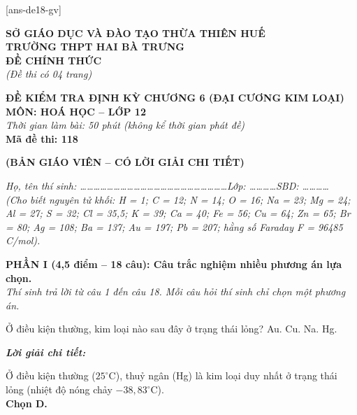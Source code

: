 \documentclass[11pt,a4paper]{article}
\def\loigiai#1{
\par\begingroup\color{blue!80!black}\small
\noindent\textbf{\textit{Lời giải chi tiết:}}\par
#1\par\endgroup}
\begin{document}
[ans-de18-gv]

\noindent
\begin{minipage}[t]{0.48\textwidth}
	\textbf{SỞ GIÁO DỤC VÀ ĐÀO TẠO THỪA THIÊN HUẾ}\\
	\textbf{TRƯỜNG THPT HAI BÀ TRƯNG}\\
	\textbf{ĐỀ CHÍNH THỨC}\\
	\textit{(Đề thi có 04 trang)}
\end{minipage}\hfill
\begin{minipage}[t]{0.48\textwidth}
	\raggedleft
	\textbf{\color{mainGreen}ĐỀ KIỂM TRA ĐỊNH KỲ CHƯƠNG 6 (ĐẠI CƯƠNG KIM LOẠI)}\\
	\textbf{MÔN: HOÁ HỌC -- LỚP 12}\\
	\textit{Thời gian làm bài: 50 phút (không kể thời gian phát đề)}\\
	\textbf{Mã đề thi: 118}
\end{minipage}


\vspace{0.1cm}
\begin{center}
	\textbf{\color{hfRed}\Large (BẢN GIÁO VIÊN -- CÓ LỜI GIẢI CHI TIẾT)}
\end{center}

\vspace{1pt}
\noindent\textit{Họ, tên thí sinh: \dots\dots\dots\dots\dots\dots\dots\dots\dots\dots\dots\dots\dots\dots\dots\dots\dots\dots\dots\dots\dots\dots Lớp: \dots\dots\dots\dots SBD: \dots\dots\dots\dots}\\
\noindent\textit{(Cho biết nguyên tử khối: H = 1; C = 12; N = 14; O = 16; Na = 23; Mg = 24; Al = 27; S = 32; Cl = 35,5; K = 39; Ca = 40; Fe = 56; Cu = 64; Zn = 65; Br = 80; Ag = 108; Ba = 137; Au = 197; Pb = 207; hằng số Faraday F = 96485 C/mol).}

\vspace{1pt}
\noindent
\textbf{PHẦN I (4,5 điểm -- 18 câu): Câu trắc nghiệm nhiều phương án lựa chọn.}\\
\textit{Thí sinh trả lời từ câu 1 đến câu 18. Mỗi câu hỏi thí sinh chỉ chọn một phương án.}

\begin{ex}
Ở điều kiện thường, kim loại nào sau đây ở trạng thái lỏng?
\choice
{Au.}
{Cu.}
{Na.}
{\True Hg.}
\loigiai{
Ở điều kiện thường ($25^\circ\text{C}$), thuỷ ngân (Hg) là kim loại duy nhất ở trạng thái lỏng (nhiệt độ nóng chảy $-38{,}83^\circ\text{C}$).\\
\textbf{Chọn D.}}
\end{ex}
\end{document}
